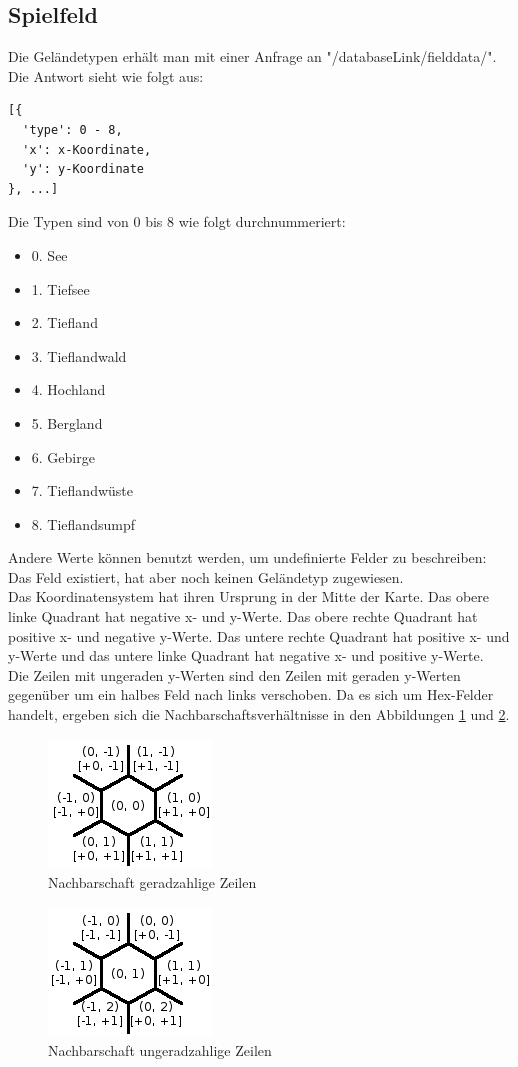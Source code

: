 \documentclass[11pt,a4paper,twocolumn]{article}
\begin{document}
\subsection{Spielfeld}\label{ss:read_field}
Die Geländetypen erhält man mit einer Anfrage an "/databaseLink/fielddata/". Die Antwort sieht wie folgt aus:
\begin{lstlisting}
[{
  'type': 0 - 8,
  'x': x-Koordinate,
  'y': y-Koordinate
}, ...]
\end{lstlisting}
Die Typen sind von 0 bis 8 wie folgt durchnummeriert:
\begin{itemize}
	\item 0. See
	\item 1. Tiefsee
	\item 2. Tiefland
	\item 3. Tieflandwald
	\item 4. Hochland
	\item 5. Bergland
	\item 6. Gebirge
	\item 7. Tieflandwüste
	\item 8. Tieflandsumpf
\end{itemize}
Andere Werte können benutzt werden, um undefinierte Felder zu beschreiben: Das Feld existiert, hat aber noch keinen Geländetyp zugewiesen.\\
Das Koordinatensystem hat ihren Ursprung in der Mitte der Karte. Das obere linke Quadrant hat negative x- und y-Werte. Das obere rechte Quadrant hat positive x- und negative y-Werte. Das untere rechte Quadrant hat positive x- und y-Werte und das untere linke Quadrant hat negative x- und positive y-Werte.\\
Die Zeilen mit ungeraden y-Werten sind den Zeilen mit geraden y-Werten gegenüber um ein halbes Feld nach links verschoben. Da es sich um Hex-Felder handelt, ergeben sich die Nachbarschaftsverhältnisse in den Abbildungen \ref{fig:neighboring_even} und \ref{fig:neighboring_odd}.
\begin{figure}[!ht]
\centering
\includegraphics{neighboring_even}
\caption{Nachbarschaft geradzahlige Zeilen}
\label{fig:neighboring_even}
\end{figure}
\begin{figure}[!ht]
\centering
\includegraphics{neighboring_odd}
\caption{Nachbarschaft ungeradzahlige Zeilen}
\label{fig:neighboring_odd}
\end{figure}
\end{document}
